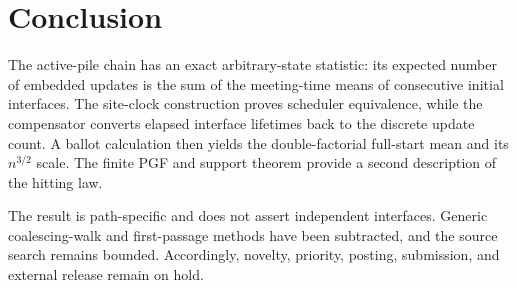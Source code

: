 \section{Conclusion}\label{sec:conclusion}

The active-pile chain has an exact arbitrary-state statistic: its expected
number of embedded updates is the sum of the meeting-time means of consecutive
initial interfaces.  The site-clock construction proves scheduler
equivalence, while the compensator converts elapsed interface lifetimes back
to the discrete update count.  A ballot calculation then yields the
double-factorial full-start mean and its $n^{3/2}$ scale.  The finite PGF and
support theorem provide a second description of the hitting law.

The result is path-specific and does not assert independent interfaces.
Generic coalescing-walk and first-passage methods have been subtracted, and
the source search remains bounded.  Accordingly, novelty, priority, posting,
submission, and external release remain on hold.

